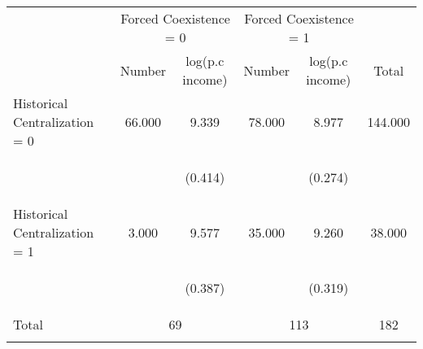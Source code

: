 \begin{center}
\begin{tabular}{lccccc}
\hline \noalign{\smallskip} & \multicolumn{2}{c}{Forced Coexistence = 0} & \multicolumn{2}{c}{Forced Coexistence = 1} & \\
 & Number & log(p.c income) & Number & log(p.c income) & Total\\
\noalign{\smallskip}\hline \noalign{\smallskip}Historical Centralization = 0 & 66.000 & 9.339 & 78.000 & 8.977 & 144.000\\
 & \begin{footnotesize}\end{footnotesize} & \begin{footnotesize}(0.414)\end{footnotesize} & \begin{footnotesize}\end{footnotesize} & \begin{footnotesize}(0.274)\end{footnotesize} & \begin{footnotesize}\end{footnotesize}\\
\noalign{\smallskip}Historical Centralization = 1 & 3.000 & 9.577 & 35.000 & 9.260 & 38.000\\
 & \begin{footnotesize}\end{footnotesize} & \begin{footnotesize}(0.387)\end{footnotesize} & \begin{footnotesize}\end{footnotesize} & \begin{footnotesize}(0.319)\end{footnotesize} & \begin{footnotesize}\end{footnotesize}\\
\noalign{\smallskip}Total & \multicolumn{2}{c}{69} & \multicolumn{2}{c}{113} & 182\\
\noalign{\smallskip}\hline\end{tabular}\\
\end{center}
